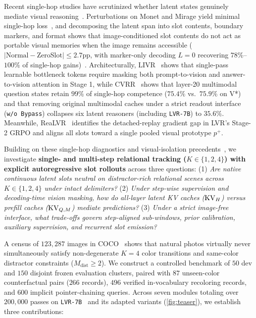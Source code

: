 Recent single-hop studies have scrutinized whether latent states genuinely mediate visual reasoning~\cite{li2026capimagine,guo2026beyond,li2026livr,park2026cvrr,realvr2026}. Perturbations on Monet and Mirage yield minimal single-hop loss~\cite{li2026capimagine}, and decomposing the latent span into slot contents, boundary markers, and format shows that image-conditioned slot contents do not act as portable visual memories when the image remains accessible ($|\text{Normal} - \text{ZeroSlot}| \le 2.7$pp, with marker-only decoding $L=0$ recovering $78\%$--$100\%$ of single-hop gains)~\cite{guo2026beyond}. Architecturally, LIVR~\cite{li2026livr} shows that single-pass learnable bottleneck tokens require masking both prompt-to-vision and answer-to-vision attention in Stage 1, while CVRR~\cite{park2026cvrr} shows that layer-20 multimodal question states retain $99\%$ of single-hop competence ($75.4\%$ vs.\ $75.9\%$ on V*) and that removing original multimodal caches under a strict readout interface (\texttt{w/o Bypass}) collapses six latent reasoners (including \texttt{LVR-7B}) to $35.6\%$. Meanwhile, ReaLVR~\cite{realvr2026} identifies the detached-replay gradient gap in LVR's Stage-2 GRPO and aligns all slots toward a single pooled visual prototype $p^+$.

Building on these single-hop diagnostics and visual-isolation precedents~\cite{guo2026beyond,li2026livr,park2026cvrr}, we investigate \textbf{single- and multi-step relational tracking ($K \in \{1, 2, 4\}$) with explicit autoregressive slot rollouts} across three questions:
(1) \emph{Are native continuous latent slots neutral on distractor-rich relational scenes across $K \in \{1, 2, 4\}$ under intact delimiters?}
(2) \emph{Under step-wise supervision and decoding-time vision masking, how do all-layer latent KV caches ($\mathrm{KV}_H$) versus prefill caches ($\mathrm{KV}_{Q,M}$) mediate predictions?}
(3) \emph{Under a strict image-free interface, what trade-offs govern step-aligned sub-windows, prior calibration, auxiliary supervision, and recurrent slot emission?}

A census of $123,287$ images in COCO~\cite{lin2014coco} shows that natural photos virtually never simultaneously satisfy non-degenerate $K=4$ color transitions and same-color distractor constraints ($M_{\mathrm{dist}} \ge 2$). We construct a controlled benchmark of $50$ dev and $150$ disjoint frozen evaluation clusters, paired with $87$ unseen-color counterfactual pairs ($266$ records), $496$ verified in-vocabulary recoloring records, and $600$ implicit pointer-chaining queries. Across seven modules totaling over $200,000$ passes on \texttt{LVR-7B}~\cite{li2026lvr} and its adapted variants (\cref{fig:teaser}), we establish three contributions:

